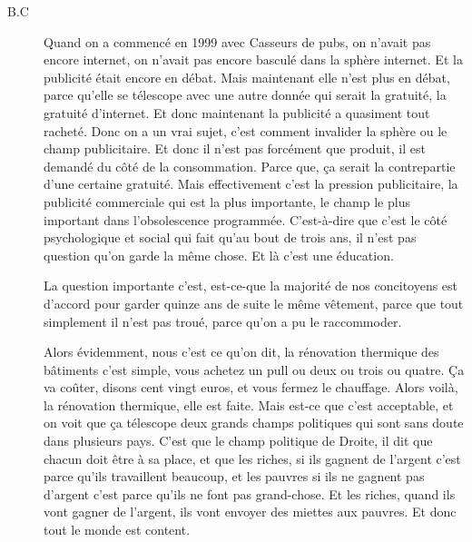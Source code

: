 \begin{description}
\item[B.C]Quand on a commencé en 1999 avec Casseurs de pubs, on n'avait pas encore internet, on n'avait pas encore basculé dans la sphère internet. Et la publicité était encore en débat. Mais maintenant elle n'est plus en débat, parce qu’elle se télescope avec une autre donnée qui serait la gratuité, la gratuité d'internet. Et donc maintenant la publicité a quasiment tout racheté. Donc on a un vrai sujet, c'est comment invalider la sphère ou le champ publicitaire. Et donc il n'est pas forcément que produit, il est demandé du côté de la consommation. Parce que, ça serait la contrepartie d'une certaine gratuité. Mais effectivement c'est la pression publicitaire, la publicité commerciale qui est la plus importante, le champ le plus important dans l'obsolescence programmée. C'est-à-dire que c'est le côté psychologique et social qui fait qu'au bout de trois ans, il n'est pas question qu'on garde la même chose. Et là c'est une éducation.

La question importante c'est, est-ce-que la majorité de nos concitoyens est d'accord pour garder quinze ans de suite  le même vêtement, parce que tout simplement il n’est pas troué, parce qu'on a pu le raccommoder. 

Alors évidemment, nous c'est ce qu'on dit, la rénovation thermique des bâtiments c'est simple, vous achetez un pull ou deux ou trois ou quatre. Ça va coûter, disons cent vingt euros, et vous fermez le chauffage. Alors voilà, la rénovation thermique, elle est faite. Mais est-ce que c'est acceptable, et on voit que ça télescope deux grands champs politiques qui sont sans doute dans plusieurs pays. C'est que le champ politique de Droite, il dit que chacun doit être à sa place, et que les riches, si ils gagnent de l'argent c'est parce qu'ils travaillent beaucoup, et les pauvres si ils ne gagnent pas d'argent c'est parce qu'ils  ne font pas grand-chose. Et les riches, quand ils vont gagner de l'argent, ils vont envoyer des miettes aux pauvres. Et donc tout le monde est content. 


\end{description}
